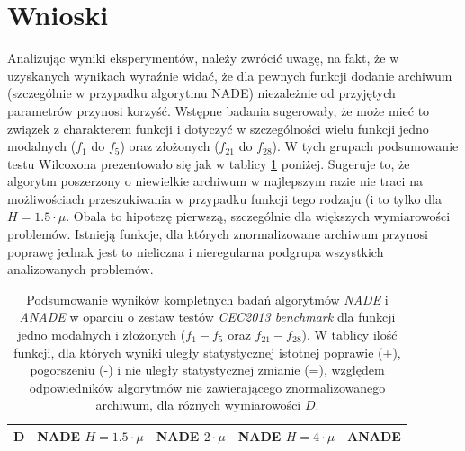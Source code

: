 \documentclass[12pt,a4paper]{report}
\begin{document}
{{{{{{{\section{Wnioski}
\par{
Analizując wyniki eksperymentów, należy zwrócić uwagę, na fakt, że w uzyskanych wynikach wyraźnie widać, że dla pewnych funkcji dodanie archiwum (szczególnie w przypadku algorytmu NADE) niezależnie od przyjętych parametrów przynosi korzyść. Wstępne badania sugerowały, że może mieć to związek z charakterem funkcji i dotyczyć w szczególności wielu funkcji jedno modalnych ($f_1$ do $f_5$) oraz złożonych ($f_{21}$ do $f_{28}$). W tych grupach podsumowanie testu Wilcoxona prezentowało się jak w tablicy \ref{FULLSUMMARYUNIandCOMPLEX} poniżej. Sugeruje to, że algorytm poszerzony o niewielkie archiwum w najlepszym razie nie traci na możliwościach przeszukiwania w przypadku funkcji tego rodzaju (i to tylko dla $H = 1.5 \cdot \mu$. Obala to hipotezę pierwszą, szczególnie dla większych wymiarowości problemów. Istnieją funkcje, dla których znormalizowane archiwum przynosi poprawę jednak jest to nieliczna i nieregularna podgrupa wszystkich analizowanych problemów.
}
\begin{table}[h]
\centering
\caption{Podsumowanie wyników kompletnych badań algorytmów \emph{NADE} i \emph{ANADE} w oparciu o zestaw testów \emph{CEC2013 benchmark} dla funkcji jedno modalnych i złożonych ($f_1 - f_5$ oraz $f_{21} - f_{28}$). W tablicy ilość funkcji, dla których wyniki uległy statystycznej istotnej poprawie (+), pogorszeniu (-) i nie uległy statystycznej zmianie (=), względem odpowiedników algorytmów nie zawierającego znormalizowanego archiwum, dla różnych wymiarowości $D$.}
\label{FULLSUMMARYUNIandCOMPLEX}
\begin{tabular}{|c|c|c|c|c|c|c|c|c|c|c|c|c|}
\hline
{\bf D}  & \multicolumn{3}{c|}{{\bf NADE $H=1.5 \cdot \mu$}} & \multicolumn{3}{c|}{{\bf NADE $2 \cdot \mu$}} & \multicolumn{3}{c|}{{\bf NADE $H=4 \cdot \mu$}} & \multicolumn{3}{c|}{{\bf ANADE}} \\ \hline

\end{tabular}
\end{table}}}}}}}}
\end{document}
